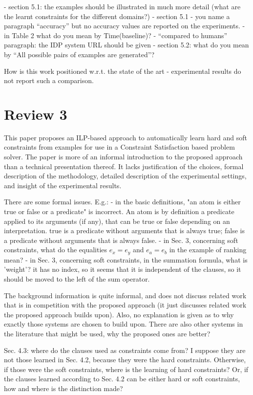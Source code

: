 \documentclass[a4paper]{article}
\begin{document}
- section 5.1: the examples should be illustrated in much more detail (what are the learnt constraints for the different domains?)
- section 5.1 - you name a paragraph “accuracy” but no accuracy values are reported on the experiments.
- in Table 2 what do you mean by Time(baseline)?
- “compared to humans” paragraph: the IDP system URL should be given
- section 5.2: what do you mean by “All possible pairs of examples are generated”?

How is this work positioned w.r.t. the state of the art - experimental results do not report such a comparison.

\section{Review 3}
This paper proposes an ILP-based approach to automatically learn hard and soft constraints from examples for use in a Constraint Satisfaction based problem solver.
The paper is more of an informal introduction to the proposed approach than a technical presentation thereof. It lacks justification of the choices, formal description of the methodology, detailed description of the experimental settings, and insight of the experimental results.

There are some formal issues. E.g.:
- in the basic definitions, "an atom is either true or false or a predicate" is incorrect. An atom is by definition a predicate applied to its arguments (if any), that can be true or false depending on an interpretation. true is a predicate without arguments that is always true; false is a predicate without arguments that is always false.
- in Sec. 3, concerning soft constraints, what do the equalities $e_x = e_y$ and $e_a = e_b$ in the example of ranking mean?
- in Sec. 3, concerning soft constraints, in the summation formula, what is 'weight'? it has no index, so it seems that it is independent of the clauses, so it should be moved to the left of the sum operator. 

The background information is quite informal, and does not discuss related work that is in competition with the proposed approach (it just discusses related work the proposed approach builds upon).
Also, no explanation is given as to why exactly those systems are chosen to build upon. There are also other systems in the literature that might be used, why the proposed ones are better?

Sec. 4.3: where do the clauses used as constraints come from? I suppose they are not those learned in Sec. 4.2, because they were the hard constraints. Otherwise, if those were the soft constraints, where is the learning of hard constraints? Or, if the clauses learned according to Sec. 4.2 can be either hard or soft constraints, how and where is the distinction made?
\end{document}
